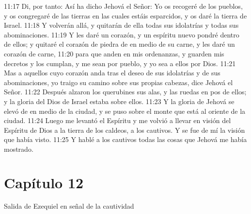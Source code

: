 11:17 Di, por tanto: Así ha dicho Jehová el Señor: Yo os recogeré de los pueblos, y os congregaré de las tierras en las cuales estáis esparcidos, y os daré la tierra de Israel.   
11:18 Y volverán allá, y quitarán de ella todas sus idolatrías y todas sus abominaciones.   
11:19 Y les daré un corazón, y un espíritu nuevo pondré dentro de ellos; y quitaré el corazón de piedra de en medio de su carne, y les daré un corazón de carne,   
11:20 para que anden en mis ordenanzas, y guarden mis decretos y los cumplan, y me sean por pueblo, y yo sea a ellos por Dios. 
11:21 Mas a aquellos cuyo corazón anda tras el deseo de sus idolatrías y de sus abominaciones, yo traigo su camino sobre sus propias cabezas, dice Jehová el Señor.   
11:22 Después alzaron los querubines sus alas, y las ruedas en pos de ellos; y la gloria del Dios de Israel estaba sobre ellos.   
11:23 Y la gloria de Jehová se elevó de en medio de la ciudad, y se puso sobre el monte que está al oriente de la ciudad. 
11:24 Luego me levantó el Espíritu y me volvió a llevar en visión del Espíritu de Dios a la tierra de los caldeos, a los cautivos. Y se fue de mí la visión que había visto.   
11:25 Y hablé a los cautivos todas las cosas que Jehová me había mostrado.   
\section*{Capítulo 12  }
Salida de Ezequiel en señal de la cautividad   
  
